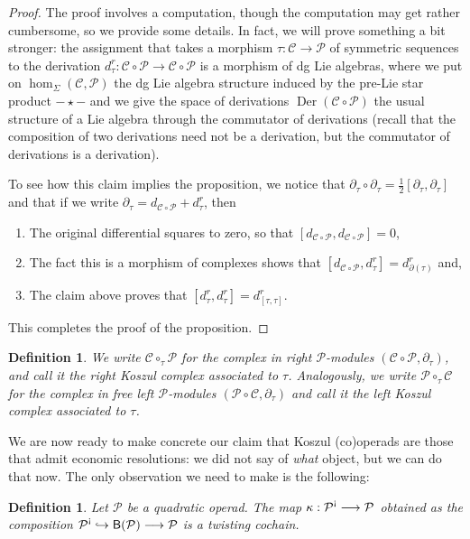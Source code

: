 \documentclass[fleqn, a4paper, twoside]{article}
\newcommand{\antishriek}{\text{\raisebox{\depth}{\textexclamdown}}}
\newcommand{\0}{\langle 0\rangle}
\newcommand{\B}[1]{\mathsf{B}(#1)}
\newenvironment{tenumerate}{
 \begin{enumerate}
  \setlength{\itemsep}{0pt}
  \setlength{\parskip}{0pt}
}{\end{enumerate}}
\DeclareRobustCommand{\[}{\begin{equation}}%
\DeclareRobustCommand{\]}{\end{equation}}%
\theoremstyle{mytheorem}
\theoremstyle{introthm}
\newcommand{\hacer}[1]{\todo[inline,linecolor= mpg-gruen,backgroundcolor=mpg-gruen!25!white,bordercolor=mpg-gruen]{#1}}
\theoremstyle{mydefinition}
\newtheorem{definition}[theorem]{Definition}
\theoremstyle{mydefinition2}
\theoremstyle{plain} %
\newcommand{\CC}{\mathcal{C}}
\newcommand{\?}{\,?\,}
\newcommand{\PP}{{\mathcal{P}}}
\theoremstyle{mytheorem}
\theoremstyle{plain} %
\begin{document}
\begin{proof}
The proof involves a computation, though the computation may get
rather cumbersome, so we provide some details. In fact, we will
prove something a bit stronger: the assignment that takes 
a morphism $\tau : \CC\longrightarrow \PP$ of symmetric
sequences to the derivation $d_\tau^r : \CC\circ\PP \longrightarrow
\CC\circ \PP$ is a morphism of dg Lie algebras, where we put
on $\hom_\Sigma(\CC,\PP)$ the dg Lie algebra structure induced by
the pre-Lie star product $-\star-$ and we give the space of
derivations $\operatorname{Der}(\CC\circ\PP)$ the usual
structure of a Lie algebra through the commutator of
derivations (recall that the composition of two derivations
need not be a derivation, but the commutator of derivations
is a derivation).

To see how this claim implies the proposition, we notice
that $\partial_\tau\circ\partial_\tau = \frac{1}{2}[\partial_\tau,\partial_\tau]$
and that if we write $\partial_\tau = d_{\CC\circ\PP} + d_\tau^r$, then
\begin{tenumerate}
\item The original differential squares to zero, so that $[d_{\CC\circ\PP},d_{\CC\circ\PP}] = 0$,
\item The fact this is a morphism of complexes shows that $[d_{\CC\circ\PP},d_\tau^r] = d_{\partial(\tau)}^r$ and,
\item The claim above proves that $[d_\tau^r,d_\tau^r] = d_{[\tau,\tau]}^r$.
\end{tenumerate}
\hacer{Prove the stronger claim.}
This completes the proof of the proposition.
\end{proof}

\begin{definition}
We write $\CC\circ_\tau \PP$ for the complex in right $\PP$-modules
$(\CC\circ \PP,\partial_\tau)$, and call it the \emph{right Koszul
complex associated to $\tau$}. Analogously, we write $\PP\circ_\tau \CC$
for the complex in free left $\PP$-modules $(\PP\circ \CC,\partial_\tau)$
and call it the \emph{left Koszul complex associated to $\tau$}.
\end{definition}

We are now ready to make concrete our claim that Koszul (co)operads are
those that admit economic resolutions: we did not say of \emph{what}
object, but we can do that now. The only observation we need to make
is the following:

\begin{definition}
Let $\PP$ be a quadratic operad. The map $\kappa : \PP^\antishriek
\longrightarrow \PP$ obtained as the composition
$\PP^\antishriek \hookrightarrow \B{\PP} \longrightarrow \PP$
is a twisting cochain.
\end{definition} 
\end{document}
